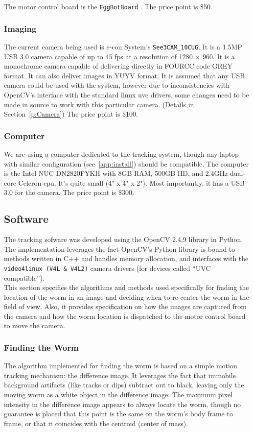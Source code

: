 \documentclass[main.tex]{subfiles}
\begin{document}
The motor control board is the \verb|EggBotBoard| \cite{EvilMadEBB}. The price point is \$50. 

\subsubsection{Imaging}
The current camera being used is e-con System's \verb|See3CAM_10CUG|. \cite{EconCam} It is a 1.5MP USB 3.0 camera capable of up to 45 fps at a resolution of 1280 $\times$ 960. It is a monochrome camera capable of delivering directly in FOURCC code GREY format. It can also deliver images in YUYV format. It is assumed that any USB camera could be used with the system, however due to inconsistencies with OpenCV's interface with the standard linux uvc drivers, some changes need to be made in source to work with this particular camera. (Details in Section~\ref{p:Camera}) The price point is \$100.

\subsubsection{Computer}
We are using a computer dedicated to the tracking system, though any laptop with similar configuration (see~\ref{app:install}) should be compatible. The computer is the Intel NUC DN2820FYKH \cite{NUC} with 8GB RAM, 500GB HD, and 2.4GHz dual-core Celeron cpu. It's quite small (4" x 4" x 2"). Most importantly, it has a USB 3.0 for the camera. The price point is \$300.\\

\subsection{Software}
The tracking sofware was developed using the OpenCV 2.4.9 library \cite{OpenCV} in Python. The implementation leverages the fact OpenCV's Python library is bound to methods written in C++ and handles memory allocation, and interfaces with the \verb|video4linux (V4L & V4L2)| camera drivers (for devices called ``UVC compatible''). \\

This section specifies the algorithms and methods used specifically for finding the location of the worm in an image and deciding when to re-center the worm in the field of view. Also, it provides specification on how the images are captured from the camera and how the worm location is dispatched to the motor control board to move the camera.

\subsubsection{Finding the Worm}
The algorithm implemented for finding the worm is based on a simple motion tracking mechanism: the difference image. It leverages the fact that immobile background artifacts (like tracks or dips) subtract out to black, leaving only the moving worm as a white object in the difference image. The maximum pixel intensity in the difference image appears to always locate the worm, though no guarantee is placed that this point is the same on the worm's body frame to frame, or that it coincides with the centroid (center of mass). \\
\end{document}
